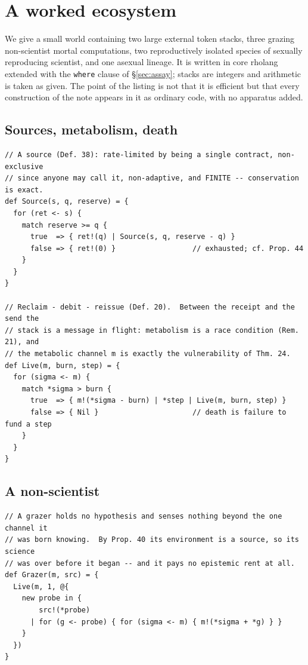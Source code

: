 \documentclass[11pt]{article}
\theoremstyle{plain}
\theoremstyle{definition}
\begin{document}
\appendix

\section{A worked ecosystem}
\label{app:eco}

We give a small world containing two large external token stacks, three grazing non-scientist mortal
computations, two reproductively isolated species of sexually reproducing scientist, and one asexual
lineage. It is written in core rholang extended with the \texttt{where} clause of \S\ref{sec:assay};
stacks are integers and arithmetic is taken as given. The point of the listing is not that it is
efficient but that every construction of the note appears in it as ordinary code, with no apparatus
added.

\subsection{Sources, metabolism, death}

\begin{lstlisting}
// A source (Def. 38): rate-limited by being a single contract, non-exclusive
// since anyone may call it, non-adaptive, and FINITE -- conservation is exact.
def Source(s, q, reserve) = {
  for (ret <- s) {
    match reserve >= q {
      true  => { ret!(q) | Source(s, q, reserve - q) }
      false => { ret!(0) }                  // exhausted; cf. Prop. 44
    }
  }
}

// Reclaim - debit - reissue (Def. 20).  Between the receipt and the send the
// stack is a message in flight: metabolism is a race condition (Rem. 21), and
// the metabolic channel m is exactly the vulnerability of Thm. 24.
def Live(m, burn, step) = {
  for (sigma <- m) {
    match *sigma > burn {
      true  => { m!(*sigma - burn) | *step | Live(m, burn, step) }
      false => { Nil }                      // death is failure to fund a step
    }
  }
}
\end{lstlisting}

\subsection{A non-scientist}

\begin{lstlisting}
// A grazer holds no hypothesis and senses nothing beyond the one channel it
// was born knowing.  By Prop. 40 its environment is a source, so its science
// was over before it began -- and it pays no epistemic rent at all.
def Grazer(m, src) = {
  Live(m, 1, @{
    new probe in {
        src!(*probe)
      | for (g <- probe) { for (sigma <- m) { m!(*sigma + *g) } }
    }
  })
}
\end{lstlisting}
\end{document}
